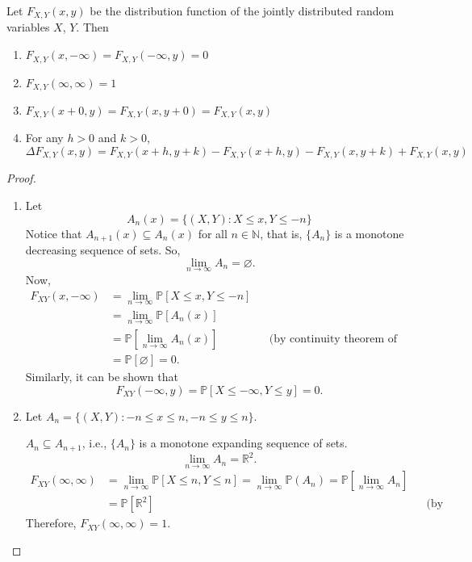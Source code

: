 \begin{theorem}
    Let $F_{X,Y}(x,y)$ be the distribution function of the jointly distributed random variables $X$, $Y$. Then
    \begin{enumerate}
        \item $F_{X,Y}(x, -\infty) = F_{X,Y}(-\infty, y) = 0$
        \item $F_{X,Y}(\infty, \infty) = 1$
        \item $F_{X,Y}(x + 0, y) = F_{X,Y}(x, y + 0) = F_{X,Y}(x, y)$
        \item For any $h > 0$ and $k > 0$,
        \[
            \Delta F_{X,Y}(x, y) = F_{X,Y}(x+h, y+k) - F_{X,Y}(x+h, y) - F_{X,Y}(x, y+k) + F_{X,Y}(x, y)
        \]
    \end{enumerate}
\end{theorem}
\begin{proof}
    \begin{enumerate}
        \item Let 
        \[A_n(x) = \{(X, Y): X \leq x, Y \leq -n\}\] 
        Notice that $A_{n+1}(x) \subseteq A_n(x)$ for all $n \in \mathbb{N}$, that is, $\{A_n\}$ is a monotone decreasing sequence of sets. So,
        \[
            \lim_{n \to \infty} A_n = \varnothing.
        \]
        Now,
        \begin{align*}
            F_{XY}(x, -\infty) &= \lim_{n \to \infty} \mathbb{P}[X \leq x, Y \leq -n]\\
            &= \lim_{n \to \infty} \mathbb{P}[A_n(x)]\\
            &= \mathbb{P}\left[ \lim_{n \to \infty} A_n(x) \right] && \text{(by continuity theorem of probability)}\\
            &= \mathbb{P}[\varnothing] = 0.
        \end{align*}
        Similarly, it can be shown that
        \[
            F_{XY}(-\infty, y) = \mathbb{P}[X \leq -\infty, Y \leq y] = 0.
        \]

        \item Let $A_n = \{(X, Y): -n \leq x \leq n, -n \leq y \leq n\}$.

        $A_n \subseteq A_{n+1}$, i.e., $\{A_n\}$ is a monotone expanding sequence of sets.
        \[
            \lim_{n \to \infty} A_n = \mathbb{R}^2.
        \]
        \begin{align*}
            F_{XY}(\infty, \infty) &= \lim_{n \to \infty} \mathbb{P}[X \leq n, Y \leq n] = \lim_{n \to \infty} \mathbb{P}(A_n) = \mathbb{P}\left[ \lim_{n \to \infty} A_n \right]\\
            &= \mathbb{P}[\mathbb{R}^2] && \text{(by continuity of probability)}
        \end{align*}
        Therefore, $F_{XY}(\infty, \infty) = 1$.


\end{enumerate}
\end{proof}
